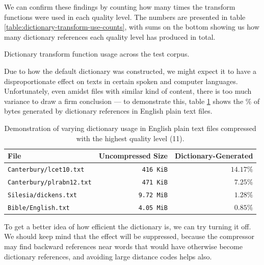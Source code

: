 \documentclass[english,master,dept460,male,cpp,cpdeclaration]{diploma}
\newcommand{\texfigure}[1]{
}
\begin{document}
		\noindent
		We can confirm these findings by counting how many times the transform functions were used in each quality level. The numbers are presented in table \ref{table:dictionary-transform-use-counts}, with sums on the bottom showing us how many dictionary references each quality level has produced in total.
		
		\begin{table}[H]
			\centering
			\caption{Dictionary transform function usage across the test corpus.}
			\label{table:dictionary-transform-use-counts}
			\texfigure{dictionary-transform-use-counts}
		\end{table}
		
		\noindent
		Due to how the default dictionary was constructed, we might expect it to have a disproportionate effect on texts in certain spoken and computer languages. Unfortunately, even amidst files with similar kind of content, there is too much variance to draw a firm conclusion --- to demonstrate this, table \ref{table:dictionary-ratio-variance} shows the \% of bytes generated by dictionary references in English plain text files.
		
		\begin{table}[H]
			\centering
			\caption{Demonstration of varying dictionary usage in English plain text files compressed with the highest quality level (11).}
			\label{table:dictionary-ratio-variance}
			
			\begin{tabular}{l|r|r}
				File                           & Uncompressed Size & Dictionary-Generated \\ \hline
				\verb|Canterbury/lcet10.txt|   &    \verb|416 KiB| &           $14.17 \%$ \\ \hline
				\verb|Canterbury/plrabn12.txt| &    \verb|471 KiB| &            $7.25 \%$ \\ \hline
				\verb|Silesia/dickens.txt|     &   \verb|9.72 MiB| &            $1.28 \%$ \\ \hline
				\verb|Bible/English.txt|       &   \verb|4.05 MiB| &            $0.85 \%$
			\end{tabular}
		\end{table}
		
		\noindent
		To get a better idea of how efficient the dictionary is, we can try turning it off. We should keep mind that the effect will be suppressed, because the compressor may find backward references near words that would have otherwise become dictionary references, and avoiding large distance codes helps also.
		
\end{document}
